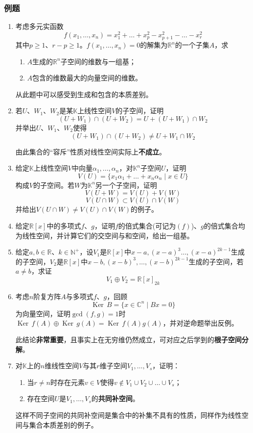 \documentclass[a4paper,UTF8,fontset=windows,AutoFakeBold]{ctexart}
\DeclareMathOperator{\Ker}{Ker\,}
\newcommand*{\note}{\noindent *}
\begin{document}
\subsubsection{例题}
\begin{enumerate}
    \item 考虑多元实函数
    $$f(x_1,\dots,x_n)=x_1^2+\dots+x_p^2-x_{p+1}^2-\dots-x_r^2$$
    其中$p\ge1$、$r-p\ge1$。$f(x_1,\dots,x_n)=0$的解集为$\mathbb{R}^n$的一个子集$A$，求
    \begin{enumerate}
        \item $A$生成的$\mathbb{R}^n$子空间的维数与一组基；
        \item $A$包含的维数最大的向量空间的维数。
    \end{enumerate}

    \note 从此题中可以感受到生成和包含的本质差别。

    \item 若$U$、$W_1$、$W_2$是某$\mathbb{K}$上线性空间$V$的子空间，证明
    $$(U+W_1)\cap(U+W_2)=U+(U+W_1)\cap W_2$$
    并举出$U$、$W_1$、$W_2$使得
    $$(U+W_1)\cap(U+W_2)\ne U+W_1\cap W_2$$

    \note 由此集合的``容斥''性质对线性空间实际上\textbf{不成立}。

    \item 给定$\mathbb{K}$上线性空间$V$中向量$\alpha_1,\dots,\alpha_n$，对$\mathbb{K}^n$子空间$U$，证明
    $$V(U)=\{x_1\alpha_1+\dots+x_n\alpha_n\mid x\in U\}$$
    构成$V$的子空间。若$W$为$\mathbb{K}^n$另一个子空间，证明
    $$V(U+W)=V(U)+V(W)$$
    $$V(U\cap W)\subset V(U)\cap V(W)$$
    并给出$V(U\cap W)\ne V(U)\cap V(W)$的例子。

    \item 给定$\mathbb{R}[x]$中的多项式$f$、$g$，证明$f$的倍式集合(可记为$(f)$)、$g$的倍式集合均为线性空间，并计算它们的交空间与和空间，给出一组基。

    \item 给定$a,b\in\mathbb{R}$、$k\in\mathbb{N}^+$，设$V_1$是$\mathbb{R}[x]$中$x-a,(x-a)^3\dots,(x-a)^{2k-1}$生成的子空间，$V_2$是$\mathbb{R}[x]$中$x-b,(x-b)^3,\dots,(x-b)^{2k-1}$生成的子空间，若$a\ne b$，求证
    $$V_1\oplus V_2=\mathbb{R}[x]_{2k}$$

    \item 考虑$n$阶复方阵$A$与多项式$f$、$g$，回顾
    $$\Ker B=\{x\in\mathbb{C}^n\mid Bx=0\}$$
    为向量空间，证明$\gcd(f,g)=1$时$\Ker f(A)\oplus\Ker g(A)=\Ker f(A)g(A)$，并对逆命题举出反例。

    \note 此结论\textbf{非常重要}，且事实上在无穷维仍然成立，可对应之后学到的\textbf{根子空间分解}。

    \item 对$\mathbb{K}$上的$n$维线性空间$V$与其$r$维子空间$V_1,\dots,V_s$，证明：
    \begin{enumerate}
        \item 当$r\ne n$时存在元素$v\in V$使得$v\notin V_1\cup V_2\cup\dots\cup V_s$；
        \item 存在空间$U$是$V_1,\dots,V_s$的\textbf{共同补空间}。
    \end{enumerate}

    \note 这样不同子空间的共同补空间是集合中的补集不具有的性质，同样作为线性空间与集合本质差别的例子。
\end{enumerate}
\end{document}
